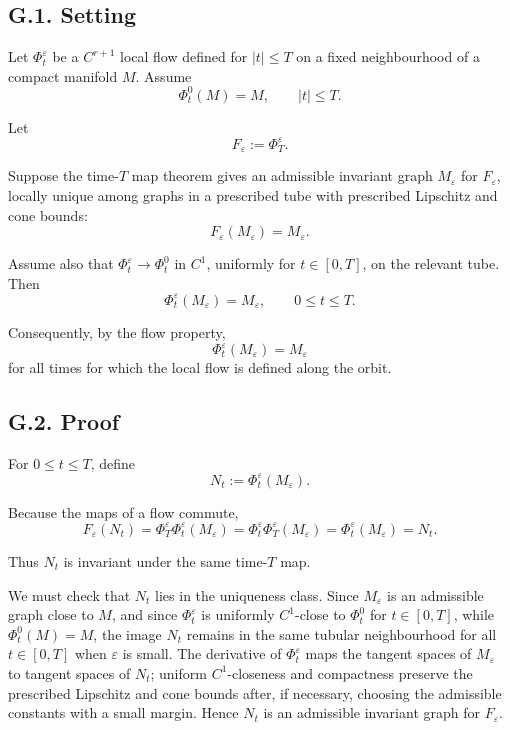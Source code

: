 \documentclass[12pt,a4paper]{article}
\theoremstyle{plain}
\numberwithin{equation}{section}
\numberwithin{theorem}{section}
\begin{document}
\subsection{G.1. Setting}

Let $\Phi_t^\varepsilon$ be a $C^{r+1}$ local flow defined for $|t|\le T$ on a fixed neighbourhood of a compact manifold $M$. Assume
\[
\Phi_t^0(M)=M,
\qquad |t|\le T.
\]

Let
\[
F_\varepsilon:=\Phi_T^\varepsilon.
\]

Suppose the time-$T$ map theorem gives an admissible invariant graph $M_\varepsilon$ for $F_\varepsilon$, locally unique among graphs in a prescribed tube with prescribed Lipschitz and cone bounds:
\[
F_\varepsilon(M_\varepsilon)=M_\varepsilon.
\]

Assume also that $\Phi_t^\varepsilon\to\Phi_t^0$ in $C^1$, uniformly for $t\in[0,T]$, on the relevant tube. Then
\[
\Phi_t^\varepsilon(M_\varepsilon)=M_\varepsilon,
\qquad 0\le t\le T.
\]

Consequently, by the flow property,
\[
\Phi_t^\varepsilon(M_\varepsilon)=M_\varepsilon
\]
for all times for which the local flow is defined along the orbit.

\subsection{G.2. Proof}

For $0\le t\le T$, define
\[
N_t:=\Phi_t^\varepsilon(M_\varepsilon).
\]

Because the maps of a flow commute,
\[
F_\varepsilon(N_t)
=
\Phi_T^\varepsilon\Phi_t^\varepsilon(M_\varepsilon)
=
\Phi_t^\varepsilon\Phi_T^\varepsilon(M_\varepsilon)
=
\Phi_t^\varepsilon(M_\varepsilon)
=N_t.
\]

Thus $N_t$ is invariant under the same time-$T$ map.

We must check that $N_t$ lies in the uniqueness class. Since $M_\varepsilon$ is an admissible graph close to $M$, and since $\Phi_t^\varepsilon$ is uniformly $C^1$-close to $\Phi_t^0$ for $t\in[0,T]$, while $\Phi_t^0(M)=M$, the image $N_t$ remains in the same tubular neighbourhood for all $t\in[0,T]$ when $\varepsilon$ is small. The derivative of $\Phi_t^\varepsilon$ maps the tangent spaces of $M_\varepsilon$ to tangent spaces of $N_t$; uniform $C^1$-closeness and compactness preserve the prescribed Lipschitz and cone bounds after, if necessary, choosing the admissible constants with a small margin. Hence $N_t$ is an admissible invariant graph for $F_\varepsilon$.
\end{document}
